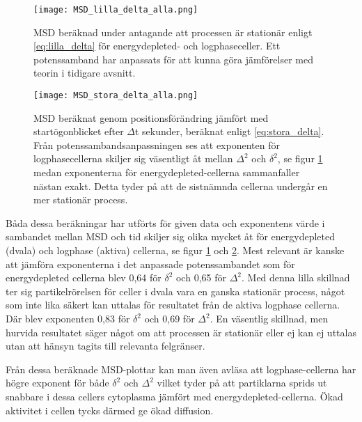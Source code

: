 \begin{figure}
    \centering
    \texttt{[image: MSD\_lilla\_delta\_alla.png]}
    \caption{MSD beräknad under antagande att processen är stationär enligt \eqref{eq:lilla_delta} för energydepleted- och logphaseceller. Ett potenssamband har anpassats för att kunna göra jämförelser med teorin i tidigare avsnitt.}
    \label{fig:MSD_ld}
\end{figure}
\begin{figure}
    \centering
    \texttt{[image: MSD\_stora\_delta\_alla.png]}
    \caption{MSD beräknat genom positionsförändring jämfört med startögonblicket efter $\Delta$t sekunder, beräknat enligt \eqref{eq:stora_delta}. Från potenssambandsanpassningen ses att exponenten för logphasecellerna skiljer sig väsentligt åt mellan $\Delta^2$ och $\delta^2$, se figur \ref{fig:MSD_ld} medan exponenterna för energydepleted-cellerna sammanfaller nästan exakt. Detta tyder på att de sistnämnda cellerna undergår en mer stationär process.}
    \label{fig:MSD_sd}
\end{figure}

Båda dessa beräkningar har utförts för given data och exponentens värde i sambandet mellan MSD och tid skiljer sig olika mycket åt för energydepleted (dvala) och logphase (aktiva) cellerna, se figur \ref{fig:MSD_ld} och \ref{fig:MSD_sd}. Mest relevant är kanske att jämföra exponenterna i det anpassade potenssambandet som för energydepleted cellerna blev 0,64 för $\delta^2$ och 0,65 för $\Delta^2$. Med denna lilla skillnad ter sig partikelrörelsen för celler i dvala vara en ganska stationär process, något som inte lika säkert kan uttalas för resultatet från de aktiva logphase cellerna. Där blev exponenten 0,83 för $\delta^2$ och 0,69 för $\Delta^2$. En väsentlig skillnad, men hurvida resultatet säger något om att processen är stationär eller ej kan ej uttalas utan att hänsyn tagits till relevanta felgränser.

Från dessa beräknade MSD-plottar kan man även avläsa att logphase-cellerna har högre exponent  för både $\delta^2$ och $\Delta^2$ vilket tyder på att partiklarna sprids ut snabbare i dessa cellers cytoplasma jämfört med energydepleted-cellerna. Ökad aktivitet i cellen tycks därmed ge ökad diffusion.


